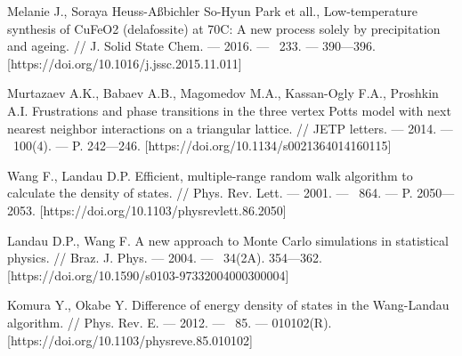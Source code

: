 \begin{thebibliography}{111}
Melanie J., Soraya Heuss-Aßbichler So-Hyun Park et all., Low-temperature synthesis of CuFeO2 (delafossite) at 70C: A new process solely by precipitation and ageing. // J. Solid State Chem. --- 2016. --- \No\ 233. --- 390---396. [https://doi.org/10.1016/j.jssc.2015.11.011]



Murtazaev A.K., Babaev A.B., Magomedov M.A., Kassan-Ogly F.A., Proshkin A.I. Frustrations and phase transitions in the three vertex Potts model with next nearest neighbor interactions on a triangular lattice. // JETP letters. --- 2014. --- \No\ 100(4). --- P. 242---246. [https://doi.org/10.1134/s0021364014160115]



Wang F., Landau D.P. Efficient, multiple-range random walk algorithm to calculate the density of states. // Phys. Rev. Lett. --- 2001. --- \No\ 864. --- P. 2050---2053. [https://doi.org/10.1103/physrevlett.86.2050]



Landau D.P., Wang F. A new approach to Monte Carlo simulations in statistical physics. // Braz. J. Phys. --- 2004. --- \No\ 34(2A). 354---362. [https://doi.org/10.1590/s0103-97332004000300004]



Komura Y., Okabe Y. Difference of energy density of states in the Wang-Landau algorithm. // Phys. Rev. E. --- 2012. --- \No\ 85. --- 010102(R). [https://doi.org/10.1103/physreve.85.010102]









\end{thebibliography}
